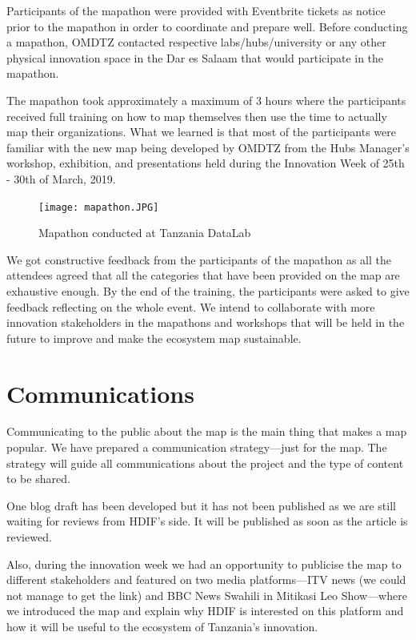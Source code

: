 \documentclass[a4paper,12pt,twoside]{article}
\begin{document}
Participants of the mapathon were provided with Eventbrite tickets as notice prior to the mapathon in order to coordinate and prepare well. Before conducting a mapathon, OMDTZ contacted respective labs/hubs/university or any other physical innovation space in the Dar es Salaam that would participate in the mapathon.

The mapathon took approximately a maximum of 3 hours where the participants received full training on how to map themselves then use the time to actually map their organizations. What we learned is that most of the participants were familiar with the new map being developed by OMDTZ from the Hubs Manager’s workshop, exhibition, and presentations held during the Innovation Week of 25th - 30th of March, 2019. 

\begin{figure}%
	\centering
	\caption{Mapathon conducted at Tanzania DataLab}
	\texttt{[image: mapathon.JPG]}
\end{figure}

We got constructive feedback from the participants of the mapathon as all the attendees agreed that all the categories that have been provided on the map are exhaustive enough. By the end of the training, the participants were asked to give feedback reflecting on the whole event. We intend to collaborate with more innovation stakeholders in the mapathons and workshops that will be held in the future to improve and make the ecosystem map sustainable.

\section{Communications}
Communicating to the public about the map is the main thing that makes a map popular. We have prepared a communication strategy---just for the map. The strategy will guide all communications about the project and the type of content to be shared.

One blog draft has been developed but it has not been published as we are still waiting for reviews from HDIF's side. It will be published as soon as the article is reviewed.

Also, during the innovation week we had an opportunity to publicise the map to different stakeholders and featured on two media platforms---ITV news (we could not manage to get the link) and BBC News Swahili in Mitikasi Leo Show---where we introduced the map and explain why HDIF is interested on this platform and how it will be useful to the ecosystem of Tanzania's innovation.
\end{document}
